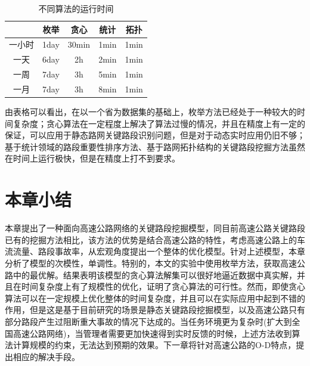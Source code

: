 				\begin{table}[h]
				\centering
				\begin{tabular}{|c|c|c|c|c|}
				\hline
				\hline
				   &   枚举 &   贪心 &   统计 &   拓扑 \\
				\hline
				  一小时 &   1day &   30min &   1min &   1min \\
				\hline
				  一天 &   6day &   2h &   2min &   1min \\
				\hline
				  一周 &   7day &   3h &   5min &   1min \\
				\hline
				  一月 &   7day &   3h &   8min &   1min \\
				\hline
				\end{tabular}
				\caption{不同算法的运行时间}
				\label{table1}
				\end{table} 

				由表格可以看出，在以一个省为数据集的基础上，枚举方法已经处于一种较大的时间复杂度；贪心算法在一定程度上解决了算法过慢的情况，并且在精度上有一定的保证，可以应用于静态路网关键路段识别问题，但是对于动态实时应用仍旧不够；基于统计领域的路段重要性排序方法、基于路网拓扑结构的关键路段挖掘方法虽然在时间上运行极快，但是在精度上打不到要求。

		\section{本章小结}
			本章提出了一种面向高速公路网络的关键路段挖掘模型，同目前高速公路关键路段已有的挖掘方法相比，该方法的优势是结合高速公路的特性，考虑高速公路上的车流流量、路段事故率，从宏观角度提出一个整体的优化模型。针对上述模型，本章分析了模型的次模性，单调性。特别的，本文的实验中使用枚举方法，获取高速公路中的最优解。结果表明该模型的贪心算法解集可以很好地逼近数据中真实解，并且在时间复杂度上有了规模性的优化，证明了贪心算法的可行性。然而，即使贪心算法可以在一定规模上优化整体的时间复杂度，并且可以在实际应用中起到不错的作用，但是这是基于目前研究的场景是静态关键路段挖掘模型，以及高速公路只有部分路段产生过阻断重大事故的情况下达成的。当任务环境更为复杂时(扩大到全国高速公路网络)，当管理者需要更加快速得到实时反馈的时候，上述方法收到算法计算规模的约束，无法达到预期的效果。下一章将针对高速公路的O-D特点，提出相应的解决手段。





			
